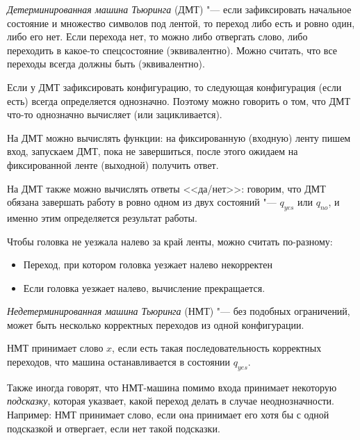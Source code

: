 	\begin{Def}
		\textit{Детерминированная машина Тьюринга} (ДМТ) "--- если зафиксировать начальное состояние и множество символов под лентой, то переход либо есть и ровно один, либо его нет.
		Если перехода нет, то можно либо отвергать слово, либо переходить в какое-то спецсостояние (эквивалентно).
		Можно считать, что все переходы всегда должны быть (эквивалентно).
	\end{Def}
	\begin{Rem}
		Если у ДМТ зафиксировать конфигурацию, то следующая конфигурация (если есть) всегда определяется однозначно.
		Поэтому можно говорить о том, что ДМТ что-то однозначно вычисляет (или зацикливается).
	\end{Rem}
	\begin{Def}
		На ДМТ можно вычислять функции: на фиксированную (входную) ленту пишем вход, запускаем ДМТ, пока не завершиться, после этого ожидаем на фиксированной ленте (выходной) получить ответ.
	\end{Def}
	\begin{Def}
		На ДМТ также можно вычислять ответы <<да/нет>>: говорим, что ДМТ обязана завершать работу в ровно одном из двух состояний "--- $q_{yes}$ или $q_{no}$, и именно этим определяется результат работы.
	\end{Def}
	\begin{Rem}
		Чтобы головка не уезжала налево за край ленты, можно считать по-разному:
		\begin{itemize}
			\item Переход, при котором головка уезжает налево некорректен
			\item Если головка уезжает налево, вычисление прекращается.
		\end{itemize}
	\end{Rem}

	\begin{Def}
		\textit{Недетерминированная машина Тьюринга} (НМТ) "--- без подобных ограничений, может быть несколько корректных переходов из одной конфигурации.
	\end{Def}
	\begin{Def}
		НМТ принимает слово $x$, если есть такая последовательность корректных переходов, что машина останавливается в состоянии $q_{yes}$.
	\end{Def}
	\begin{Rem}
		Также иногда говорят, что НМТ-машина помимо входа принимает некоторую \textit{подсказку}, которая указвает, какой переход делать в случае неоднозначности.
		Например: НМТ принимает слово, если она принимает его хотя бы с одной подсказкой и отвергает, если нет такой подсказки.
	\end{Rem}

